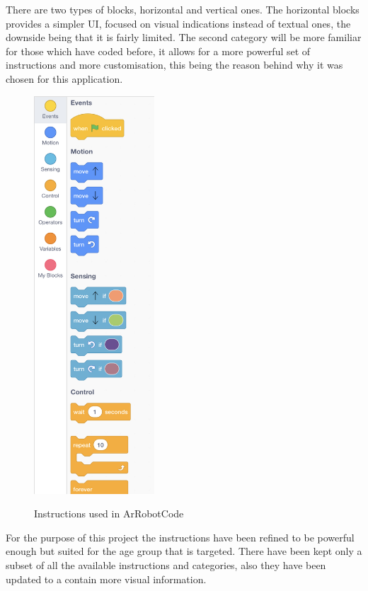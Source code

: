 \documentclass[12 pct]{report}
\begin{document}
There are two types of blocks, horizontal and vertical ones. The horizontal blocks provides a simpler UI, focused on visual indications instead of textual ones, the downside being that it is fairly limited. The second category will be more familiar for those which have coded before, it allows for a more powerful set of instructions and more customisation, this being the reason behind why it was chosen for this application.

\begin{figure}[H]
\includegraphics[width=0.4\textwidth]{allInstructions}
\centering
\label{fig:hololens}
\caption{Instructions used in ArRobotCode}
\end{figure}

For the purpose of this project the instructions have been refined to be powerful enough but suited for the age group that is targeted. There have been kept only a subset of all the available instructions and categories, also they have been updated to a contain more visual information. 
\end{document}
